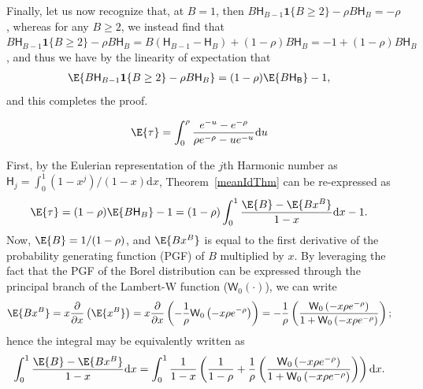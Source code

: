 Finally, let us now recognize that, at $B = 1$, then
$
B \mathsf{H}_{B-1} \mathbf{1}\{B \geq 2\}
-
\rho B \mathsf{H}_{B}
=
-
\rho
$,
whereas for any $B \geq 2$, we instead find that
$
B \mathsf{H}_{B-1} \mathbf{1}\{B \geq 2\}
-
\rho B \mathsf{H}_{B}
=
B (\mathsf{H}_{B-1} - \mathsf{H}_B)
+
(1-\rho) B \mathsf{H}_{B}
=
-1
+
(1-\rho) B \mathsf{H}_{B}
$,
and thus we have by the linearity of expectation that
\begin{align}
\E{B \mathsf{H}_{B-1} \mathbf{1}\{B \geq 2\}
-
\rho B \mathsf{H}_{B}}
&=
(1-\rho)\E{B \mathsf{H}_\mathsf{B}}
-
1
,
\end{align}
and this completes the proof.
\hfill\Halmos\endproof



\begin{corollary}
\begin{align}
\E{\tau}
&=
\int_0^\rho
\frac{e^{-u} - e^{-\rho}}{\rho e^{-\rho} - u e^{-u}}\mathrm{d}u
\end{align}
\end{corollary}
First, by the Eulerian representation of the $j$th Harmonic number as $\mathsf{H}_j = \int_0^1 (1-x^j)/(1-x) \mathrm{d}x$, Theorem~\ref{meanIdThm} can be re-expressed as
\begin{align}
\E{\tau}
&=
(1-\rho)\E{B \mathsf{H}_B} - 1
=
(1-\rho)\int_0^1\frac{\E{B} - \E{B x^B}}{1-x}\mathrm{d}x
-
1
.
\end{align}
Now, $\E{B} = 1/(1-\rho)$, and $\E{B x^B}$ is equal to the first derivative of the probability generating function (PGF) of $B$ multiplied by $x$. By leveraging the fact that the PGF of the Borel distribution can be expressed through the principal branch of the Lambert-W function ($\mathsf{W}_0(\cdot)$), we can write
\begin{align}
\E{B x^B}
&=
x \frac{\partial}{\partial x}
\left(
\E{x^B}
\right)
=
x \frac{\partial}{\partial x}
\left(
-\frac{1}{\rho}\mathsf{W}_0\left(-x \rho e^{-\rho}\right)
\right)
=
-
\frac{1}{\rho}
\left(
\frac{\mathsf{W}_0\left(-x \rho e^{-\rho}\right)}
{1 + \mathsf{W}_0\left(-x \rho e^{-\rho}\right)}
\right)
;
\end{align}
hence the integral may be equivalently written as
\begin{align}
\int_0^1\frac{\E{B} - \E{B x^B}}{1-x}\mathrm{d}x
&=
\int_0^1\frac{1}{1-x}\left(\frac{1}{1-\rho} +  \frac{1}{\rho}
\left(
\frac{\mathsf{W}_0\left(-x \rho e^{-\rho}\right)}
{1 + \mathsf{W}_0\left(-x \rho e^{-\rho}\right)}
\right)\right)\mathrm{d}x
.
\end{align}

